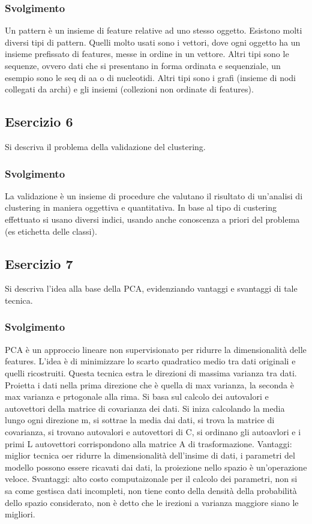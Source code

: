 \documentclass{article}
\begin{document}
\subsubsection*{Svolgimento}
Un pattern è un insieme di feature relative ad uno stesso oggetto. Esistono molti diversi tipi di pattern.
Quelli molto usati sono i vettori, dove ogni oggetto ha un insieme prefissato di features, messe in ordine
in un vettore. Altri tipi sono le sequenze, ovvero dati che si presentano in forma ordinata e sequenziale, un
esempio sono le seq di aa o di nucleotidi. Altri tipi sono i grafi (insieme di nodi collegati da archi) e gli
insiemi (collezioni non ordinate di features).

\subsection*{Esercizio 6}
Si descriva il problema della validazione del clustering.
\subsubsection*{Svolgimento}
La validazione è un insieme di procedure che valutano il risultato di un'analisi di clustering in maniera
oggettiva e quantitativa. In base al tipo di custering effettuato si usano diversi indici, usando anche
conoscenza a priori del problema (es etichetta delle classi).

\subsection*{Esercizio 7}
Si descriva l'idea alla base della PCA, evidenziando vantaggi e svantaggi di tale tecnica.
\subsubsection*{Svolgimento}
PCA è un approccio lineare non supervisionato per ridurre la dimensionalità delle features. L'idea è di
minimizzare lo scarto quadratico medio tra dati originali e quelli ricostruiti. Questa tecnica estra le
direzioni di massima varianza tra dati. Proietta i dati nella prima direzione che è quella di max varianza, la
seconda è max varianza e prtogonale alla rima. Si basa sul calcolo dei autovalori e autovettori della
matrice di covarianza dei dati. Si iniza calcolando la media lungo ogni direzione m, si sottrae la media dai
dati, si trova la matrice di covarianza, si trovano autovalori e autovettori di C, si ordinano gli autoavlori e
i primi L autovettori corrispondono alla matrice A di trasformazione.
Vantaggi: miglior tecnica oer ridurre la dimensionalità dell'insime di dati, i parametri del modello
possono essere ricavati dai dati, la proiezione nello spazio è un'operazione veloce.
Svantaggi: alto costo computaizonale per il calcolo dei parametri, non si sa come gestisca dati incompleti,
non tiene conto della densità della probabilità dello spazio considerato, non è detto che le irezioni a
varianza maggiore siano le migliori.
\end{document}
